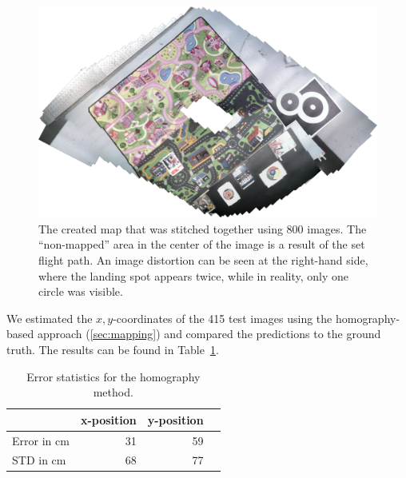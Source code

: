 \documentclass[11pt]{report}
\begin{document}
\begin{figure}[H]
\begin{center}
\includegraphics[width=0.7\columnwidth]{map_rotated}
\caption{{\label{fig:mapexp} The created map that was stitched
    together using 800 images. The ``non-mapped'' area in the center
    of the image is a result of the set flight path. An image
    distortion can be seen at the right-hand side, where the landing
    spot appears twice, while in reality, only one circle was
    visible.%
  }}
\end{center}
\end{figure}

We estimated the $x,y$-coordinates of the 415 test images using the
homography-based approach (\ref{sec:mapping}) and compared the
predictions to the ground truth. The results can be found in
Table~\ref{tab:homoerror}. 


\begin{table}[H]
  \centering
  \begin{tabular}{lrrr}
    \toprule
    & x-position & y-position\\
    \midrule
    Error in cm & 31 & 59\\
    STD in cm & 68 & 77\\
    \bottomrule
  \end{tabular}
  \caption[Error statistics homography method.]{Error statistics for the homography method.}
  \label{tab:homoerror}
\end{table}
\end{document}
